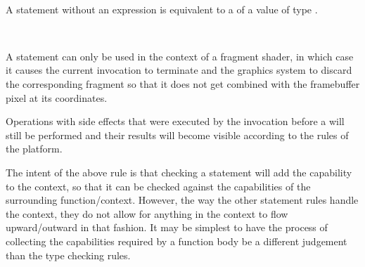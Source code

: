 \begin{Syntax}
		 \SynOpt \code{;} \\
\end{Syntax}

\begin{Checking}
\end{Checking}

\begin{Checking}
\end{Checking}

\begin{Description}
	A  statement without an expression is equivalent to a  of a value of type .
\end{Description}


\begin{Syntax}
		 \code{;} \\
\end{Syntax}

\begin{Description}
A  statement can only be used in the context of a fragment shader, in which case it causes the current invocation to terminate and the graphics system to discard the corresponding fragment so that it does not get combined with the framebuffer pixel at its coordinates.

Operations with side effects that were executed by the invocation before a  will still be performed and their results will become visible according to the rules of the platform.	
\end{Description}

\begin{Checking}
\end{Checking}

\begin{Incomplete}
The intent of the above rule is that checking a  statement will add the  capability to the context, so that it can be checked against the capabilities of the surrounding function/context.
However, the way the other statement rules handle the context, they do not allow for anything in the context to flow upward/outward in that fashion.
It may be simplest to have the process of collecting the capabilities required by a function body be a different judgement than the type checking rules.
\end{Incomplete}
	